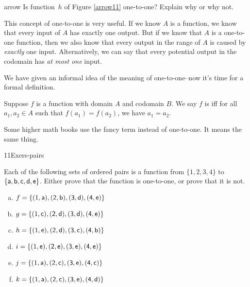 \begin{exercise}{arrow}
Is function~$h$ of Figure \ref{arrow11} one-to-one?  Explain why or why not.
\end{exercise}

This concept of one-to-one is very useful.  If we know $A$ is a function, we know that every input of $A$ has exactly one output.  But if we know that $A$ is a one-to-one function, then we also know that every output in the range of $A$ is caused by \emph{exactly} one input.  Alternatively, we can say that every potential output in the codomain has \emph{at most one} input.

We have given an informal idea of the meaning of one-to-one--now it's time for a formal definition.

\begin{defn} \label{121defn}
Suppose $f$ is a function with domain $A$ and codomain $B$. We say $f$ is   iff for all $a_1,a_2 \in A$  such that
$f(a_1) = f(a_2)$, we have $a_1 = a_2$. 
\end{defn}
Some higher math books use the fancy term  instead of one-to-one. It means the same thing.


\begin{exercise}{11Exers-pairs}
 
 Each of the following sets of ordered pairs is a function from $\{1,2,3,4\}$ to $\{\sf{a},\sf{b},\sf{c},\sf{d},\sf{e}\}$. Either prove that the function is one-to-one, or prove that it is not.
\begin{multicols}{2}
\begin{enumerate}[(a)]
\item  \label{11Exers-pairs-f}
$f = \{ (1,\sf{a}), (2,\sf{b}), (3,\sf{d}), (4,\sf{e})\}$
\item  \label{11Exers-pairs-g}
$g = \{ (1,\sf{c}), (2,\sf{d}), (3,\sf{d}), (4,\sf{e})\}$
\item  \label{11Exers-pairs-h}
$h = \{ (1,\sf{e}), (2,\sf{d}), (3,\sf{c}), (4,\sf{b})\}$
\item  \label{11Exers-pairs-i}
$i = \{ (1,\sf{e}), (2,\sf{e}), (3,\sf{e}), (4,\sf{e})\}$
\item  \label{11Exers-pairs-j}
$j = \{ (1,\sf{a}), (2,\sf{c}), (3,\sf{e}), (4,\sf{c})\}$
\item  \label{11Exers-pairs-k}
$k = \{ (1,\sf{a}), (2,\sf{c}), (3,\sf{e}), (4,\sf{d})\}$
\end{enumerate}
\end{multicols}
\end{exercise}

